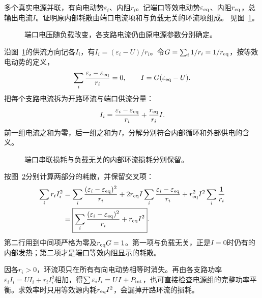 \begin{example}[并联电源内耗的精确分解]\label{ex:c1-source-loss}
多个真实电源并联，有向电动势$\varepsilon_i$、内阻$r_i$。记端口等效电动势$\varepsilon_{\rm eq}$、内阻$r_{\rm eq}$，总输出电流$I$。证明原内部耗散由端口电流项和与负载无关的环流项组成。 见图~\ref{fig:c1-source-loss-q}。
\end{example}

\begin{figure}[H]\centering
{}
\caption{端口电压随负载改变，各支路电流仍由原电源参数分别确定。}\label{fig:c1-source-loss-q}
\end{figure}
\begin{solution}
沿图~\ref{fig:c1-source-loss-q}的供流方向记各$I_i$，有$I_i=(\varepsilon_i-U)/r_i$。令$G=\sum_i1/r_i=1/r_{\rm eq}$，按等效电动势的定义，
\[
 \sum_i\frac{\varepsilon_i-\varepsilon_{\rm eq}}{r_i}=0,
 \qquad I=G(\varepsilon_{\rm eq}-U).
\]
把每个支路电流拆为开路环流与端口供流分量：
\[
 I_i=\frac{\varepsilon_i-\varepsilon_{\rm eq}}{r_i}
       +\frac{r_{\rm eq}}{r_i}I.
\]
前一组电流之和为零，后一组之和为$I$，分解分别符合内部循环和外部供电的含义。
\begin{figure}[H]\centering
{}
\caption{端口串联损耗与负载无关的内部环流损耗分别保留。}\label{fig:c1-source-loss-s}
\end{figure}
按图~\ref{fig:c1-source-loss-s}分别计算两部分的耗散，并保留交叉项：
\[
 \begin{aligned}
 \sum_i r_iI_i^2
 &=\sum_i\frac{(\varepsilon_i-\varepsilon_{\rm eq})^2}{r_i}
 +2r_{\rm eq}I\sum_i\frac{\varepsilon_i-\varepsilon_{\rm eq}}{r_i}
 +r_{\rm eq}^2I^2\sum_i\frac1{r_i}\\
 &=\boxed{\sum_i\frac{(\varepsilon_i-\varepsilon_{\rm eq})^2}{r_i}
 +r_{\rm eq}I^2}.
 \end{aligned}
\]
第二行用到中间项严格为零及$r_{\rm eq}G=1$。第一项与负载无关，正是$I=0$时仍有的内部发热；第二项才是端口等效内阻显示的耗散。

因各$r_i>0$，环流项只在所有有向电动势相等时消失。再由各支路功率$\varepsilon_iI_i=UI_i+r_iI_i^2$相加，得$\sum\varepsilon_iI_i=UI+P_{\rm int}$，也可直接检查电源组的完整功率平衡。求效率时只用等效源内耗$r_{\rm eq}I^2$，会漏掉开路环流的损耗。
\end{solution}
